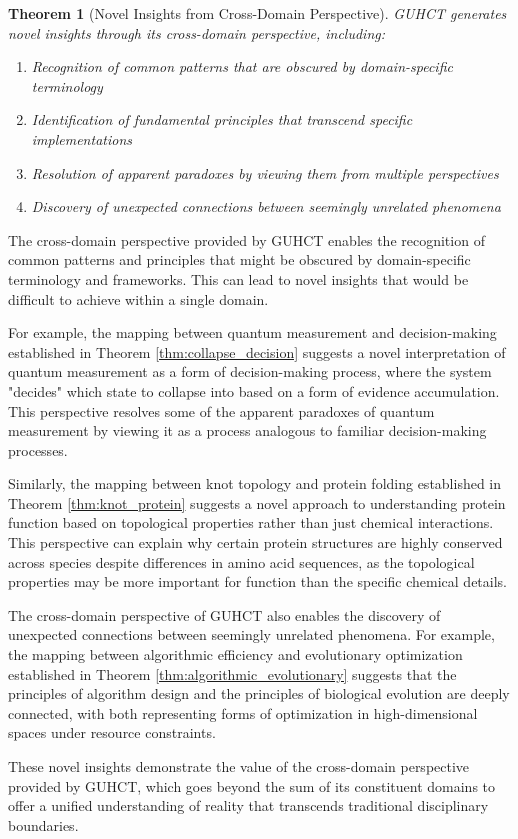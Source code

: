\documentclass[11pt,a4paper]{article}
\makeatletter
\newtheorem{theorem}{Theorem}[section]
\renewenvironment{proof}[1][\proofname]{\par
  \pushQED{\qed}%
  \normalfont \topsep6\p@\@plus6\p@\relax
  \trivlist
  \item[\hskip\labelsep
        \itshape
    #1\@addpunct{.}]\ignorespaces
}{%
  \popQED\endtrivlist\@endpefalse
}
\makeatother
\begin{document}
\begin{theorem}[Novel Insights from Cross-Domain Perspective]
\label{thm:cross_domain_insights}
GUHCT generates novel insights through its cross-domain perspective, including:
\begin{enumerate}
    \item Recognition of common patterns that are obscured by domain-specific terminology
    \item Identification of fundamental principles that transcend specific implementations
    \item Resolution of apparent paradoxes by viewing them from multiple perspectives
    \item Discovery of unexpected connections between seemingly unrelated phenomena
\end{enumerate}
\end{theorem}

\begin{proof}
The cross-domain perspective provided by GUHCT enables the recognition of common patterns and principles that might be obscured by domain-specific terminology and frameworks. This can lead to novel insights that would be difficult to achieve within a single domain.

For example, the mapping between quantum measurement and decision-making established in Theorem \ref{thm:collapse_decision} suggests a novel interpretation of quantum measurement as a form of decision-making process, where the system "decides" which state to collapse into based on a form of evidence accumulation. This perspective resolves some of the apparent paradoxes of quantum measurement by viewing it as a process analogous to familiar decision-making processes.

Similarly, the mapping between knot topology and protein folding established in Theorem \ref{thm:knot_protein} suggests a novel approach to understanding protein function based on topological properties rather than just chemical interactions. This perspective can explain why certain protein structures are highly conserved across species despite differences in amino acid sequences, as the topological properties may be more important for function than the specific chemical details.

The cross-domain perspective of GUHCT also enables the discovery of unexpected connections between seemingly unrelated phenomena. For example, the mapping between algorithmic efficiency and evolutionary optimization established in Theorem \ref{thm:algorithmic_evolutionary} suggests that the principles of algorithm design and the principles of biological evolution are deeply connected, with both representing forms of optimization in high-dimensional spaces under resource constraints.

These novel insights demonstrate the value of the cross-domain perspective provided by GUHCT, which goes beyond the sum of its constituent domains to offer a unified understanding of reality that transcends traditional disciplinary boundaries.
\end{proof}
\end{document}
